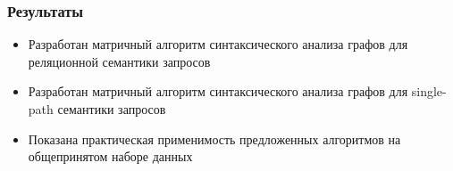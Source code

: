 \documentclass{beamer}
\begin{document}
\begin{frame}[fragile]
	\transwipe[direction=90]
	\frametitle{Результаты}
	\begin{itemize}
		\item Разработан матричный алгоритм синтаксического анализа графов для реляционной семантики запросов
		\item Разработан матричный алгоритм синтаксического анализа графов для single-path семантики запросов
		\item Показана практическая применимость предложенных алгоритмов на общепринятом наборе данных
	\end{itemize}
\end{frame}
\end{document}
